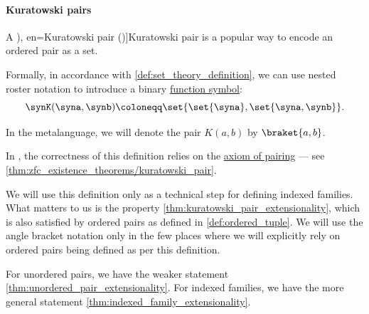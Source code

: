 \paragraph{Kuratowski pairs}

\begin{definition}\label{def:kuratowski_pair}
  A \term[ru=упорядоченная пара по Куратовскому (\cite[thm. 9]{ШеньВерещагин2020НачалаТеорииМножеств}), en=Kuratowski pair (\cite[22]{Kunen2013SetTheory})]{Kuratowski pair} is a popular way to encode an ordered pair as a set.

  Formally, in accordance with \cref{def:set_theory_definition}, we can use nested roster notation to introduce a binary \hyperref[def:fol_signature/function]{function symbol}:
  \begin{equation*}
    \synK(\syna, \synb) \coloneqq \set{ \set{ \syna }, \set{ \syna, \synb } }.
  \end{equation*}

  In the metalanguage, we will denote the pair \( K(a, b) \) by \( \braket{ a, b } \).
\end{definition}
\begin{comments}
  \item In \hyperref[def:zfc]{}, the correctness of this definition relies on the \hyperref[def:zfc/pairing]{axiom of pairing} --- see \cref{thm:zfc_existence_theorems/kuratowski_pair}.

  \item We will use this definition only as a technical step for defining indexed families. What matters to us is the property \cref{thm:kuratowski_pair_extensionality}, which is also satisfied by ordered pairs as defined in \cref{def:ordered_tuple}. We will use the angle bracket notation only in the few places where we will explicitly rely on ordered pairs being defined as per this definition.

  \item For unordered pairs, we have the weaker statement \cref{thm:unordered_pair_extensionality}. For indexed families, we have the more general statement \cref{thm:indexed_family_extensionality}.
\end{comments}

